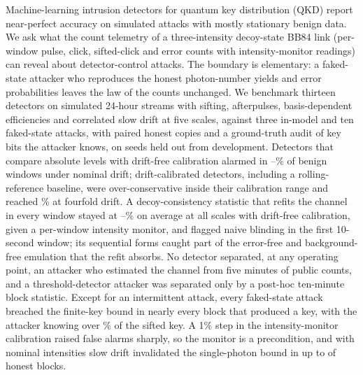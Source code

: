 Machine-learning intrusion detectors for quantum key distribution (QKD) report near-perfect accuracy on simulated attacks with mostly stationary benign data. We ask what the count telemetry of a three-intensity decoy-state BB84 link (per-window pulse, click, sifted-click and error counts with intensity-monitor readings) can reveal about detector-control attacks. The boundary is elementary: a faked-state attacker who reproduces the honest photon-number yields and error probabilities leaves the law of the counts unchanged. We benchmark thirteen detectors on simulated 24-hour streams with sifting, afterpulses, basis-dependent efficiencies and correlated slow drift at five scales, against three in-model and ten faked-state attacks, with paired honest copies and a ground-truth audit of key bits the attacker knows, on \nSeeds{} seeds held out from development. Detectors that compare absolute levels with drift-free calibration alarmed in \fprRFstatDOne--\fprBandDOne\% of benign windows under nominal drift; drift-calibrated detectors, including a rolling-reference baseline, were over-conservative inside their calibration range and reached \fprIFdriftDFour\% at fourfold drift. A decoy-consistency statistic that refits the channel in every window stayed at \fprDCSMin--\fprDCSMax\% on average at all scales with drift-free calibration, given a per-window intensity monitor, and flagged naive blinding in the first 10-second window; its sequential forms caught part of the error-free and background-free emulation that the refit absorbs. No detector separated, at any operating point, an attacker who estimated the channel from five minutes of public counts, and a threshold-detector attacker was separated only by a post-hoc ten-minute block statistic. Except for an intermittent attack, every faked-state attack breached the finite-key bound in nearly every block that produced a key, with the attacker knowing over \blindKnownMin\% of the sifted key. A 1\% step in the intensity-monitor calibration raised false alarms sharply, so the monitor is a precondition, and with nominal intensities slow drift invalidated the single-photon bound in up to \violNomDFour{} of \nBlocksHonestDFour{} honest blocks.
